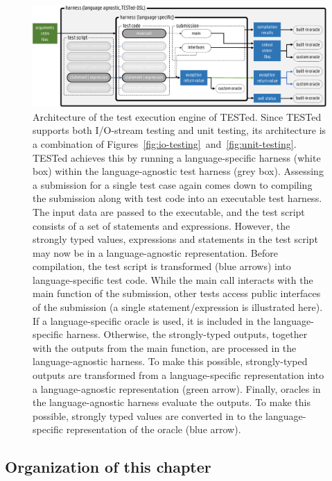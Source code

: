 \documentclass[../main]{subfiles}
\begin{document}
\begin{figure}
    \centering
    \includegraphics[width=\textwidth]{tested-testing}
    \caption{
        Architecture of the test execution engine of TESTed.
        Since TESTed supports both I/O-stream testing and unit testing, its architecture is a combination of Figures~\ref{fig:io-testing}~and~\ref{fig:unit-testing}.
        TESTed achieves this by running a language-specific harness (white box) within the language-agnostic test harness (grey box).
        Assessing a submission for a single test case again comes down to compiling the submission along with test code into an executable test harness.
        The \textcolor{ugent-ps}{input data} are passed to the executable, and the test script consists of a set of statements and expressions.
        However, the strongly typed values, expressions and statements in the test script may now be in a language-agnostic representation.
        Before compilation, the test script is transformed (blue arrows) into language-specific test code.
        While the main call interacts with the main function of the submission, other tests access public interfaces of the submission (a single statement/expression is illustrated here).
        If a language-specific oracle is used, it is included in the language-specific harness.
        Otherwise, the strongly-typed \textcolor{ugent-we}{outputs}, together with the \textcolor{ugent-we}{outputs} from the main function, are processed in the language-agnostic harness.
        To make this possible, strongly-typed \textcolor{ugent-we}{outputs} are transformed from a language-specific representation into a language-agnostic representation (green arrow).
        Finally, oracles in the language-agnostic harness evaluate the outputs.
        To make this possible, strongly typed values are converted in to the language-specific representation of the oracle (blue arrow).\label{fig:tested-testing}}
\end{figure}

\subsection{Organization of this chapter}\label{subsec:dsl-organization}
\end{document}
